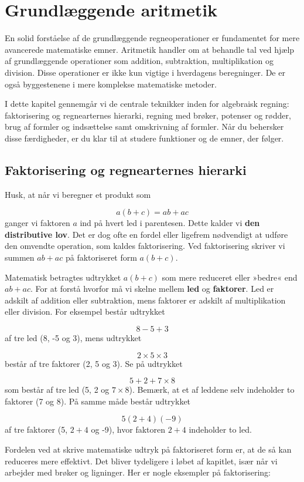 \chapter{Grundlæggende aritmetik}
\label{chap:ch0}
En solid forståelse af de grundlæggende regneoperationer er fundamentet for mere avancerede matematiske emner. Aritmetik handler om at behandle tal ved hjælp af grundlæggende operationer som addition, subtraktion, multiplikation og division. Disse operationer er ikke kun vigtige i hverdagens beregninger. De er også byggestenene i mere komplekse matematiske metoder.

I dette kapitel gennemgår vi de centrale teknikker inden for algebraisk regning: faktorisering og regnearternes hierarki, regning med brøker, potenser og rødder, brug af formler og indsættelse samt omskrivning af formler. Når du behersker disse færdigheder, er du klar til at studere funktioner og de emner, der følger.

\section{Faktorisering og regnearternes hierarki}
Husk, at når vi beregner et produkt som

\[
a(b + c) = ab + ac
\]
ganger vi faktoren \(a\) ind på hvert led i parentesen. Dette kalder vi \textbf{den distributive lov}. Det er dog ofte en fordel eller ligefrem nødvendigt at udføre den omvendte operation, som kaldes faktorisering. Ved faktorisering skriver vi summen \(ab + ac\) på faktoriseret form \(a(b + c)\).

Matematisk betragtes udtrykket \(a(b + c)\) som mere reduceret eller »bedre« end \(ab + ac\). For at forstå hvorfor må vi skelne mellem \textbf{led} og \textbf{faktorer}. Led er adskilt af addition eller subtraktion, mens faktorer er adskilt af multiplikation eller division. For eksempel består udtrykket

\[ 
8 - 5 + 3 
\]
af tre led (8, -5 og 3), mens udtrykket

\[ 
2 \times 5 \times 3 
\]
består af tre faktorer (2, 5 og 3). Se på udtrykket

\[ 
5 + 2 + 7 \times 8 
\]
som består af tre led (5, 2 og \(7 \times 8\)). Bemærk, at et af leddene selv indeholder to faktorer (7 og 8). På samme måde består udtrykket

\[ 
5(2 + 4)(-9) 
\]
af tre faktorer (5, \(2 + 4\) og -9), hvor faktoren \(2 + 4\) indeholder to led.

Fordelen ved at skrive matematiske udtryk på faktoriseret form er, at de så kan reduceres mere effektivt. Det bliver tydeligere i løbet af kapitlet, især når vi arbejder med brøker og ligninger. Her er nogle eksempler på faktorisering:

